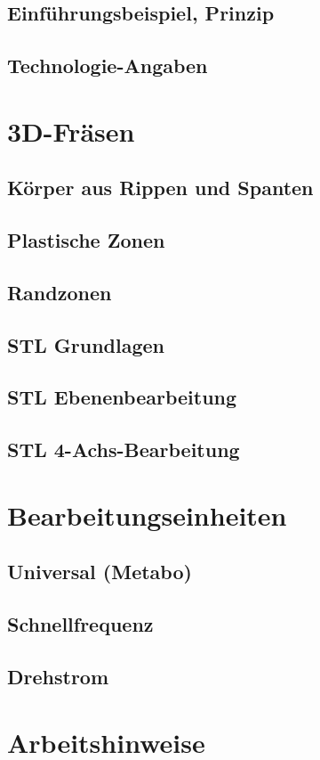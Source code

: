 \documentclass[14pt,a4paper]{book}
\begin{document}
		\subsection{Einführungsbeispiel, Prinzip} 
		\subsection{Technologie-Angaben} 
	\section{3D-Fräsen}
		\subsection{Körper aus Rippen und Spanten} 
		\subsection{Plastische Zonen} 
		\subsection{Randzonen} 
		\subsection{STL Grundlagen} 
		\subsection{STL Ebenenbearbeitung} 
		\subsection{STL 4-Achs-Bearbeitung}
	\section{Bearbeitungseinheiten} 
		\subsection{Universal (Metabo)} 
		\subsection{Schnellfrequenz} 
		\subsection{Drehstrom} 	 
	\section{Arbeitshinweise}
\end{document}
